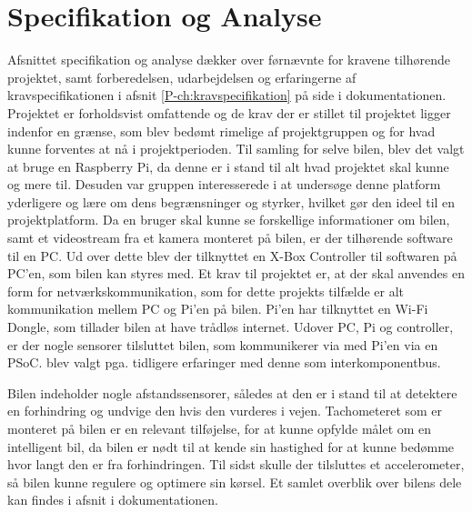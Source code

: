 \section{Specifikation og Analyse}
\label{ch:Specifikation_og_Analyse}

Afsnittet specifikation og analyse dækker over førnævnte for kravene tilhørende projektet, samt forberedelsen, udarbejdelsen og erfaringerne af kravspecifikationen i afsnit \ref{P-ch:kravspecifikation}  på side \pageref{P-ch:kravspecifikation} i dokumentationen. \\

Projektet er forholdsvist omfattende og de krav der er stillet til projektet ligger indenfor en grænse, som blev bedømt rimelige af projektgruppen og for hvad kunne forventes at nå i projektperioden.
Til samling for selve bilen, blev det valgt at bruge en Raspberry Pi, da denne er i stand til alt hvad projektet skal kunne og mere til. 
Desuden var gruppen interesserede i at undersøge denne platform yderligere og lære om dens begrænsninger og styrker, hvilket gør den ideel til en projektplatform.
Da en bruger skal kunne se forskellige informationer om bilen, samt et videostream fra et kamera monteret på bilen, er der tilhørende software til en PC. 
Ud over dette blev der tilknyttet en X-Box Controller til softwaren på PC'en, som bilen kan styres med.
Et krav til projektet er, at der skal anvendes en form for netværkskommunikation, som for dette projekts tilfælde er alt kommunikation mellem PC og Pi'en på bilen.
Pi'en har tilknyttet en Wi-Fi Dongle, som tillader bilen at have trådløs internet. Udover PC, Pi og controller, er der nogle sensorer tilsluttet bilen, som kommunikerer via \IIC med Pi'en via en PSoC. 
\IIC blev valgt pga. tidligere erfaringer med denne som interkomponentbus. 

Bilen indeholder nogle afstandssensorer, således at den er i stand til at detektere en forhindring og undvige den hvis den vurderes i vejen. Tachometeret som er monteret på bilen er en relevant tilføjelse, for at kunne opfylde målet om en intelligent bil, da bilen er nødt til at kende sin hastighed for at kunne bedømme hvor langt den er fra forhindringen. Til sidst skulle der tilsluttes et accelerometer, så bilen kunne regulere og optimere sin kørsel. 
Et samlet overblik over bilens dele kan findes i afsnit  i dokumentationen.

\clearpage
